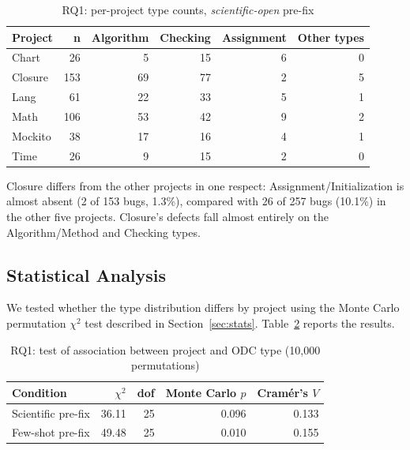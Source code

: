 \documentclass{iutbscthesis}
\begin{document}
\begin{table}[!htbp]
    \centering
    \begin{tabular}{l r r r r r}
        \toprule
        \textbf{Project} & \textbf{n} & \textbf{Algorithm} & \textbf{Checking} & \textbf{Assignment} & \textbf{Other types} \\
        \midrule
        Chart   & 26  & 5  & 15 & 6 & 0 \\
        Closure & 153 & 69 & 77 & 2 & 5 \\
        Lang    & 61  & 22 & 33 & 5 & 1 \\
        Math    & 106 & 53 & 42 & 9 & 2 \\
        Mockito & 38  & 17 & 16 & 4 & 1 \\
        Time    & 26  & 9  & 15 & 2 & 0 \\
        \bottomrule
    \end{tabular}
    \caption{RQ1: per-project type counts, \textit{scientific-open} pre-fix}
    \label{tab:rq1_project}
\end{table}

Closure differs from the other projects in one respect: Assignment/\allowbreak Initialization is almost absent (2 of 153 bugs, 1.3\%), compared with 26 of 257 bugs (10.1\%) in the other five projects. Closure's defects fall almost entirely on the Algorithm/Method and Checking types.

\subsection{Statistical Analysis}

We tested whether the type distribution differs by project using the Monte Carlo permutation $\chi^2$ test described in Section~\ref{sec:stats}. Table~\ref{tab:rq1_stats} reports the results.

\begin{table}[!htbp]
    \centering
    \begin{tabular}{l r r r r}
        \toprule
        \textbf{Condition} & $\chi^2$ & \textbf{dof} & \textbf{Monte Carlo} $p$ & \textbf{Cram\'er's} $V$ \\
        \midrule
        Scientific pre-fix & 36.11 & 25 & 0.096 & 0.133 \\
        Few-shot pre-fix   & 49.48 & 25 & 0.010 & 0.155 \\
        \bottomrule
    \end{tabular}
    \caption{RQ1: test of association between project and ODC type (10{,}000 permutations)}
    \label{tab:rq1_stats}
\end{table}
\end{document}
